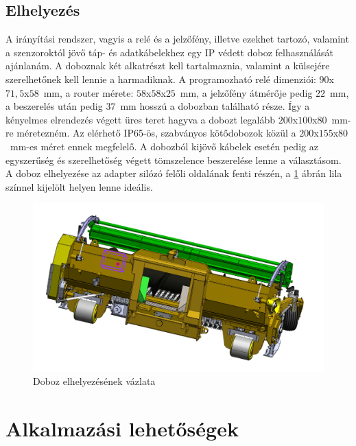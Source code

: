 \subsection{Elhelyezés}

A irányítási rendszer, vagyis a relé és a jelzőfény, illetve ezekhet tartozó, valamint a szenzoroktól jövő táp- és adatkábelekhez egy IP védett doboz felhasználását ajánlanám. A doboznak két alkatrészt kell tartalmaznia, valamint a külsejére szerelhetőnek kell lennie a harmadiknak. A programozható relé dimenziói: $90$x$71,5$x$58$~mm, a router mérete: $58$x$58$x$25$~mm, a jelzőfény átmérője pedig $22$~mm, a beszerelés után pedig $37$~mm hosszú a dobozban található része. Így a kényelmes elrendezés végett üres teret hagyva a dobozt legalább $200$x$100$x$80$~mm-re méretezném. Az elérhető IP65-ös, szabványos kötődobozok közül a $200$x$155$x$80$~mm-es méret ennek megfelelő. A dobozból kijövő kábelek esetén pedig az egyszerűség és szerelhetőség végett tömszelence beszerelése lenne a választásom. A doboz elhelyezése az adapter silózó felőli oldalának fenti részén, a \ref{doboz_elhelyezes} ábrán lila színnel kijelölt helyen lenne ideális.
\begin{figure}
	\centering
	\includegraphics[width=\columnwidth*7/10]{figures/rajzolt_doboz.jpg}
	\caption{Doboz elhelyezésének vázlata}
	\label{doboz_elhelyezes}
\end{figure}

\section{Alkalmazási lehetőségek}

